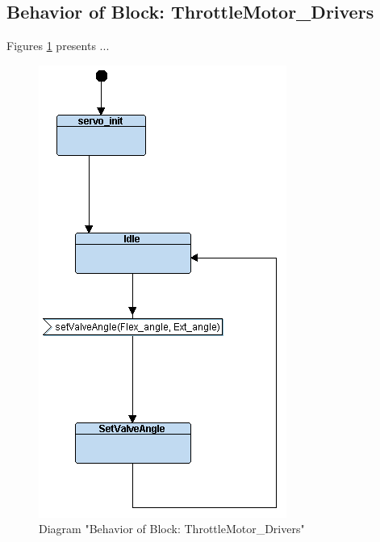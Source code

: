 \subsection{Behavior of Block: ThrottleMotor\_Drivers}
Figures \ref{fig:ThrottleMotorDriversThrottleMotorDrivers23} presents ...
\begin{figure}[htb]
\centering
\includegraphics[width=\textwidth]{img_2_3.png}
\caption{Diagram "Behavior of Block: ThrottleMotor\_Drivers"}
\label{fig:ThrottleMotorDriversThrottleMotorDrivers23}
\end{figure}

